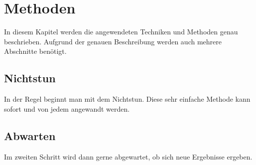 \chapter{Methoden}

In diesem Kapitel werden die angewendeten Techniken und Methoden genau beschrieben. Aufgrund der genauen Beschreibung werden auch mehrere Abschnitte benötigt.

\section{Nichtstun}

In der Regel beginnt man mit dem Nichtstun. Diese sehr einfache Methode kann sofort und von jedem angewandt werden.

\section{Abwarten}

Im zweiten Schritt wird dann gerne abgewartet, ob sich neue Ergebnisse ergeben.